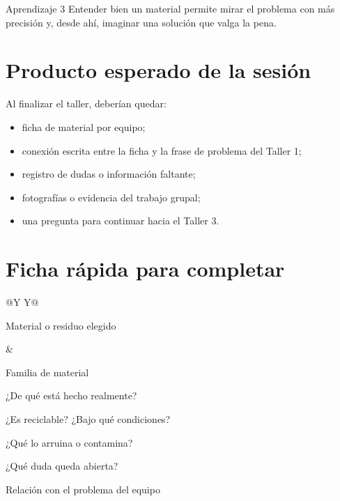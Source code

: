 \documentclass[10pt,a4paper]{article}
\newcommand{\fieldbox}[2]{%
  \begin{infobox}[height=#2]{#1}
  \vspace*{\fill}
  \end{infobox}
}
\begin{document}
\begin{infobox}{Aprendizaje 3}
Entender bien un material permite mirar el problema con más precisión y, desde ahí, imaginar una solución que valga la pena.
\end{infobox}

\section{Producto esperado de la sesión}

Al finalizar el taller, deberían quedar:
\begin{itemize}
  \item ficha de material por equipo;
  \item conexión escrita entre la ficha y la frase de problema del Taller 1;
  \item registro de dudas o información faltante;
  \item fotografías o evidencia del trabajo grupal;
  \item una pregunta para continuar hacia el Taller 3.
\end{itemize}

\newpage
\section{Ficha rápida para completar}

\begin{tabularx}{\textwidth}{@{}Y Y@{}}
\fieldbox{Material o residuo elegido}{14mm}
&
\fieldbox{Familia de material}{14mm}
\end{tabularx}

\fieldbox{¿De qué está hecho realmente?}{18mm}
\fieldbox{¿Es reciclable? ¿Bajo qué condiciones?}{18mm}
\fieldbox{¿Qué lo arruina o contamina?}{18mm}
\fieldbox{¿Qué duda queda abierta?}{17mm}
\fieldbox{Relación con el problema del equipo}{20mm}
\end{document}
